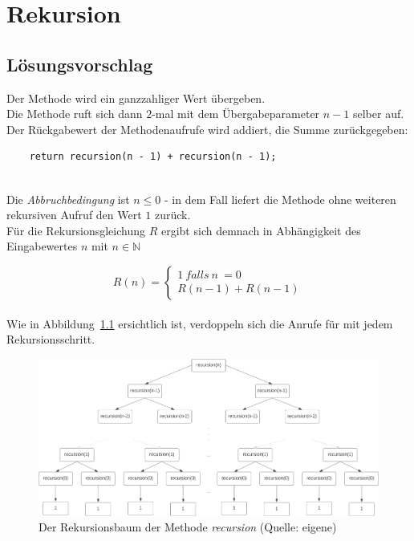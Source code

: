 \usepackage{lstmisc}
\usepackage{amsfonts}\chapter{Rekursion}

\section{Lösungsvorschlag}

Der Methode  wird ein ganzzahliger Wert übergeben.\\
Die Methode ruft sich dann $2$-mal mit dem Übergabeparameter $n - 1$ selber auf.\\
Der Rückgabewert der Methodenaufrufe wird addiert, die Summe zurückgegeben:

\begin{verbatim}
    return recursion(n - 1) + recursion(n - 1);
\end{verbatim}\\

\noindent
Die \textit{Abbruchbedingung} ist $n \leq 0$ - in dem Fall liefert die Methode ohne weiteren rekursiven Aufruf den Wert $1$ zurück.\\


\noindent
Für die Rekursionsgleichung $R$ ergibt sich demnach in Abhängigkeit des Eingabewertes $n$ mit $n \in \mathbb{N}$

\begin{equation}
    R(n) = \begin{cases}
               1\ falls\ n\ = 0 \\
               R(n-1) + R(n-1)
    \end{cases}
\end{equation}\\

\noindent
Wie in Abbildung~\ref{fig:recursion} ersichtlich ist, verdoppeln sich die Anrufe für  mit jedem Rekursionsschritt.\\

\begin{figure}
    \begin{center}
        \includegraphics[scale=0.3]{chapters/9. Rekursion/img/recursion}
        \caption{Der Rekursionsbaum der Methode \textit{recursion} (Quelle: eigene)}
        \label{fig:recursion}
    \end{center}
\end{figure}


